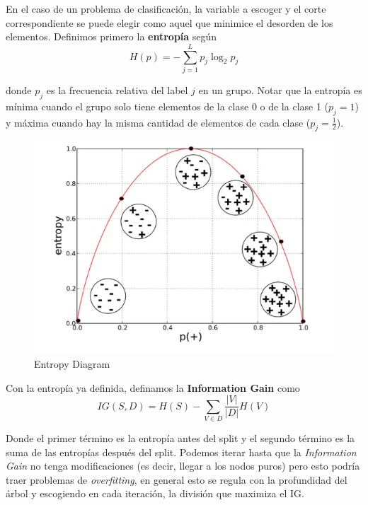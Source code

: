 En el caso de un problema de clasificación, la variable a escoger y el corte correspondiente se puede elegir como aquel que minimice el desorden de los elementos. Definimos primero la \textbf{entropía} según 
$$H(p) = - \sum_{j=1}^{L}p_j\log_{2}p_j$$

donde $p_j$ es la frecuencia relativa del label $j$ en un grupo. Notar que la entropía es mínima cuando el grupo solo tiene elementos de la clase 0 o de la clase 1 ($p_j = 1$) y máxima cuando hay la misma cantidad de elementos de cada clase ($p_j = \frac{1}{2}$). 

\begin{figure}[H]
    \center
    \includegraphics[scale=0.3]{notebooks/ML/img/entropy_diagram.png}
    \caption{Entropy Diagram}
\end{figure}

Con la entropía ya definida, definamos la \textbf{Information Gain} como 
$$IG(S,D) = H(S) - \sum_{V \in D}\frac{|V|}{|D|}H(V)$$

Donde el primer término es la entropía antes del split y el segundo término es la suma de las entropías después del split. Podemos iterar hasta que la \textit{Information Gain} no tenga modificaciones (es decir, llegar a los nodos puros) pero esto podría traer problemas de \textit{overfitting}, en general esto se regula con la profundidad del árbol y escogiendo en cada iteración, la división que maximiza el IG. 

